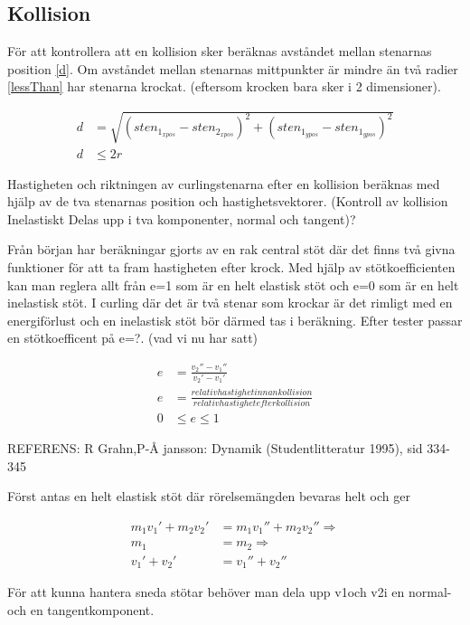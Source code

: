 \documentclass[11pt]{article} %
\begin{document}
\subsection{Kollision}

För att kontrollera att en kollision sker beräknas avståndet mellan stenarnas position \eqref{d}.
Om avståndet mellan stenarnas mittpunkter är mindre än två radier \eqref{lessThan} har stenarna krockat.  (eftersom krocken bara sker i 2 dimensioner). 

 \begin{align}\label{d}
 d& = \sqrt{(sten_{1_{xpos}} - sten_{2_{xpos}})^2   +   (sten_{1_{ypos}}-sten_{1_{ypos}})^2}\\\label{lessThan}
 d& \le 2 r
 \end{align}

Hastigheten och riktningen av curlingstenarna efter en kollision beräknas med hjälp av de tva stenarnas position och hastighetsvektorer.
(Kontroll av kollision Inelastiskt Delas upp i tva komponenter, normal och tangent)?

Från början har beräkningar gjorts av en rak central stöt där det finns två givna funktioner för att ta fram hastigheten efter krock. Med hjälp av stötkoefficienten kan man reglera allt från e=1 som är en helt elastisk stöt och e=0 som är en helt inelastisk stöt. I curling där det är två stenar som krockar är det rimligt med en energiförlust och en inelastisk stöt bör därmed tas i beräkning. Efter tester passar en stötkoefficent på e=?. (vad vi nu har satt)

 \begin{align}\label{e1}
 e& = \frac{v_2''-v_1''}{v_2'-v_1'}\\
 e& = \frac{relativ hastighet innan kollision}{relativ hastighet efter kollision}\\
0& \le e \le 1
 \end{align}

REFERENS: R Grahn,P-Å jansson: Dynamik (Studentlitteratur 1995), sid 334-345

Först antas en helt elastisk stöt där rörelsemängden bevaras helt och ger

 \begin{align}\label{elastisk}
m_1 v_1' + m_2 v_2'& = m_1 v_1'' + m_2 v_2'' \Rightarrow\\
m_1& = m_2 \Rightarrow\\
v_1' + v_2'& = v_1'' + v_2''
 \end{align}

För att kunna hantera sneda stötar behöver man dela upp v1och v2i en normal- och en tangentkomponent. 
\end{document}
